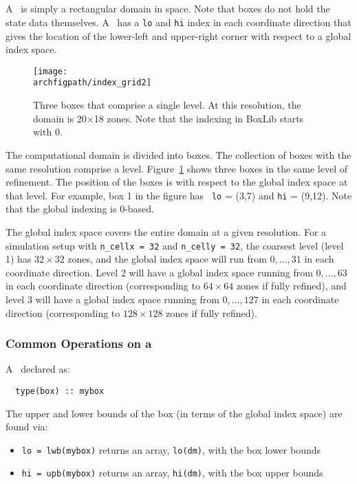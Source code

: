 \subsection{\boxtype}

A \boxtype\ is simply a rectangular domain in space.  Note that boxes
do not hold the state data themselves.  A \boxtype\ has a {\tt lo} 
and {\tt hi} index in each coordinate direction that gives the
location of the lower-left and upper-right corner with respect to
a global index space.  

\begin{figure}[t]
\centering
\texttt{[image: \\archfigpath/index\_grid2]}
\caption[Single-level grid structure]
{\label{fig:boxes} Three boxes that comprise a single level.  At this
  resolution, the domain is 20$\times$18 zones.  Note that the
  indexing in BoxLib starts with $0$.}
\end{figure}


The computational domain is divided into boxes.  The collection of
boxes with the same resolution comprise a level.
Figure~\ref{fig:boxes} shows three boxes in the same level of
refinement.  The position of the boxes is with respect to the global
index space at that level.  For example, box 1 in the figure has {\tt
  lo} = (3,7) and {\tt hi} = (9,12).  Note that the global indexing
is 0-based.

The global index space covers the entire domain at a given resolution.
For a simulation setup with {\tt n\_cellx = 32} and {\tt n\_celly =
  32}, the coarsest level (level 1) has $32 \times 32$ zones, and the
global index space will run from $0, \ldots, 31$ in each coordinate
direction.  Level 2 will have a global index space running from $0,
\ldots, 63$ in each coordinate direction (corresponding to $64 \times
64$ zones if fully refined), and level 3 will have a global index
space running from $0, \ldots, 127$ in each coordinate direction
(corresponding to $128\times 128$ zones if fully refined).


\subsubsection{Common Operations on a \boxtype}

A \boxtype\ declared as:
\begin{verbatim}
  type(box) :: mybox
\end{verbatim}
%
The upper and lower bounds of the box (in terms of the global
index space) are found via:
\begin{itemize}

\item {\tt lo = lwb(mybox)} returns an array, {\tt lo(dm)}, with
     the box lower bounds

\item {\tt hi = upb(mybox)} returns an array, {\tt hi(dm)}, with
     the box upper bounds

\end{itemize}




